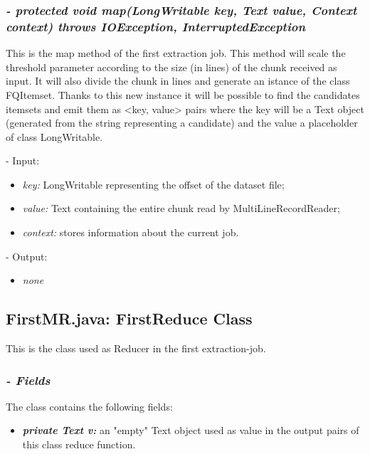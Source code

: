 \documentclass[]{report}
\begin{document}
	\subsubsection*{\textit{\textbf{-} protected void map(LongWritable key, Text value, Context context) throws IOException, InterruptedException}}   	
	This is the map method of the first extraction job. This method will scale the threshold parameter according to the size (in lines) of the chunk received as input. It will also divide the chunk in lines and generate an istance of the class FQItemset. Thanks to this new instance it will be possible to find the candidates itemsets and emit them as <key, value> pairs where the key will be a Text object (generated from the string representing a candidate) and the value a placeholder of class LongWritable.    
	\begin{description}
		\item - Input:
		\begin{itemize}
			\item \textit{key:} LongWritable representing the offset of the dataset file;
			\item \textit{value:} Text containing the entire chunk read by MultiLineRecordReader;
			\item \textit{context:} stores information about the current job.
		\end{itemize}
	\end{description}	
	\begin{description}
		\item - Output:
		\begin{itemize}
			\item \textit{none} 
		\end{itemize}
	\end{description}
	
	
	\subsection*{FirstMR.java: FirstReduce Class}
	This is the class used as Reducer in the first extraction-job.
	\subsubsection*{\textit{\textbf{-} Fields}} 
	The class contains the following fields:
	\begin{itemize}
		\item \textit{\textbf{private Text v:}} an "empty" Text object used as value in the output pairs of this class reduce function.	
	\end{itemize}
	
\end{document}
